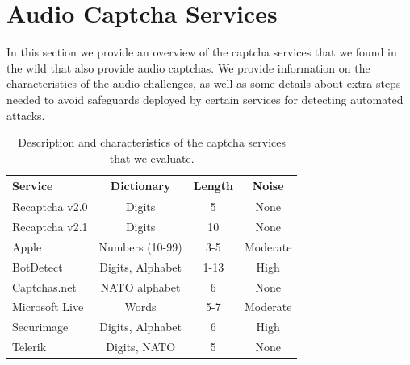 \section{Audio Captcha Services}
\label{sec:services}

In this section we provide an overview of the captcha services that we found in the wild
that also provide audio captchas. We provide information on the characteristics of the audio challenges, as
well as some details about extra steps needed to avoid safeguards deployed by certain services for 
detecting automated attacks.


\begin{table}[t]
\centering
\caption{Description and characteristics of the captcha services that we evaluate.}
\begin{tabular}{lccc}
\toprule
\textbf{Service}& \textbf{Dictionary}& \textbf{Length} & \textbf{Noise} \\
\hline
Recaptcha v2.0 & Digits & 5 & None \\
\rowcolor{Gray}
Recaptcha v2.1 & Digits & 10 & None \\
Apple & Numbers (10-99) & 3-5 & Moderate\\
\rowcolor{Gray}
BotDetect & Digits, Alphabet & 1-13 & High \\
Captchas.net & NATO alphabet & 6 & None \\
\rowcolor{Gray}
Microsoft Live & Words & 5-7 & Moderate \\
Securimage & Digits, Alphabet & 6 & High \\
\rowcolor{Gray}
Telerik & Digits, NATO & 5 & None \\
\bottomrule
\end{tabular}
\label{tab:services}
\end{table}

